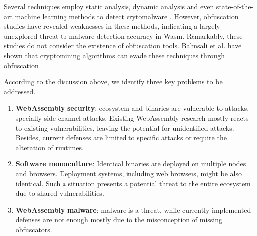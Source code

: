 Several techniques employ static analysis, dynamic analysis and even state-of-the-art machine learning methods to detect \Wasm crytomalware \cite{Minesweeper,MinerRay,MINOS,SEISMIC,RAPID,Outguard}.
However, obfuscation studies have revealed weaknesses in these methods, indicating a largely unexplored threat to malware detection accuracy in Wasm.
Remarkably, these studies do not consider the existence of obfuscation tools.
Bahnsali et al. have shown that cryptomining algorithms can evade these techniques through obfuscation \cite{10.1145/3507657.3528560}.







According to the discussion above, we identify three key problems to be addressed.

\begin{enumerate}[label=\textbf{Ps\arabic*}, ref=C\arabic*]

	\item \label{prob4} \textbf{WebAssembly security}: \Wasm ecosystem and binaries are vulnerable to attacks, specially side-channel attacks. Existing WebAssembly research mostly reacts to existing vulnerabilities, leaving the potential for unidentified attacks.
	Besides, current defenses are limited to specific attacks or require the alteration of runtimes. 
	
	\item \label{prob2} \textbf{Software monoculture}: 
	Identical \Wasm binaries are deployed on multiple nodes and browsers. 
	Deployment systems, including web browsers, might be also identical. 
	Such a situation presents a potential threat to the entire ecosystem due to shared vulnerabilities.
	 
	\item \label{prob5} \textbf{WebAssembly malware}: \Wasm malware is a threat, while currently implemented defenses are not enough mostly due to the misconception of missing obfuscators.

\end{enumerate}


\begin{comment}
\msection{Problem statement}

\end{comment}



